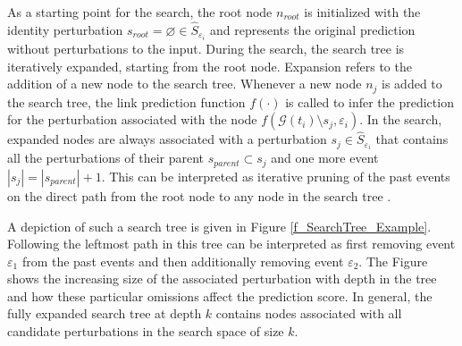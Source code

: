 
As a starting point for the search, the root node $n_{root}$ is initialized with the identity perturbation $s_{root} = \varnothing \in \hat{S}_{\varepsilon_i}$ and represents the original prediction without perturbations to the input. During the search, the search tree is iteratively expanded, starting from the root node. Expansion refers to the addition of a new node to the search tree. Whenever a new node $n_j$ is added to the search tree, the link prediction function $f(\cdot)$ is called to infer the prediction for the perturbation associated with the node $f(\mathcal{G}(t_i) \setminus s_j, \varepsilon_i)$. In the search, expanded nodes are always associated with a perturbation $s_j \in \hat{S}_{\varepsilon_i}$ that contains all the perturbations of their parent $s_{parent} \subset s_j$ and one more event $|s_j| = |s_{parent}| + 1$. This can be interpreted as iterative pruning of the past events on the direct path from the root node to any node in the search tree \cite{yuan_explainability_2021}.

A depiction of such a search tree is given in Figure \ref{f_SearchTree_Example}. Following the leftmost path in this tree can be interpreted as first removing event $\varepsilon_1$ from the past events and then additionally removing event $\varepsilon_2$. The Figure shows the increasing size of the associated perturbation with depth in the tree and how these particular omissions affect the prediction score. In general, the fully expanded search tree at depth $k$ contains nodes associated with all candidate perturbations in the search space of size $k$.


